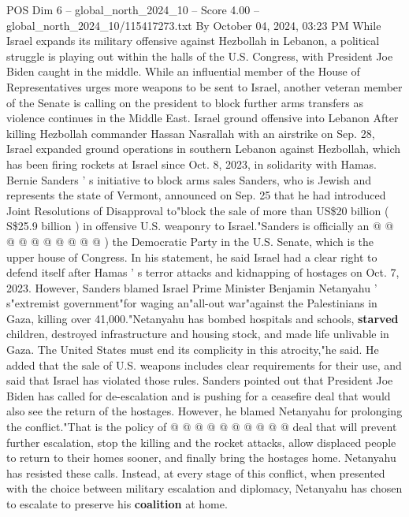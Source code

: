 \begin{textsample}{POS Dim 6 – global\_north\_2024\_10 – Score 4.00 – global\_north\_2024\_10/115417273.txt}  \label{ex:f6_pos_380}
By October 04, 2024, 03:23 PM While Israel expands its military offensive against Hezbollah in Lebanon, a political struggle is playing out within the halls of the U.S.
Congress, with President Joe Biden caught in the middle.
While an influential member of the House of Representatives urges more weapons to be sent to Israel, another veteran member of the Senate is calling on the president to block further arms transfers as violence continues in the Middle East.
Israel ground offensive into Lebanon After killing Hezbollah commander Hassan Nasrallah with an airstrike on Sep. 28, Israel expanded ground operations in southern Lebanon against Hezbollah, which has been firing rockets at Israel since Oct. 8, 2023, in solidarity with Hamas.
Bernie Sanders ' s initiative to block arms sales Sanders, who is Jewish and represents the state of Vermont, announced on Sep. 25 that he had introduced Joint Resolutions of Disapproval to"block the sale of more than US\$20 billion ( S\$25.9 billion ) in offensive U.S. weaponry to Israel."Sanders is officially an @ @ @ @ @ @ @ @ @ @ ) the Democratic Party in the U.S.
Senate, which is the upper house of Congress.
In his statement, he said Israel had a clear right to defend itself after Hamas ' s terror attacks and kidnapping of hostages on Oct. 7, 2023.
However, Sanders blamed Israel Prime Minister Benjamin Netanyahu ' s"extremist government"for waging an"all-out war"against the Palestinians in Gaza, killing over 41,000."Netanyahu has bombed hospitals and schools, \textbf{starved} children, destroyed infrastructure and housing stock, and made life unlivable in Gaza.
The United States must end its complicity in this atrocity,"he said.
He added that the sale of U.S. weapons includes clear requirements for their use, and said that Israel has violated those rules.
Sanders pointed out that President Joe Biden has called for de-escalation and is pushing for a ceasefire deal that would also see the return of the hostages.
However, he blamed Netanyahu for prolonging the conflict."That is the policy of @ @ @ @ @ @ @ @ @ @ deal that will prevent further escalation, stop the killing and the rocket attacks, allow displaced people to return to their homes sooner, and finally bring the hostages home.
Netanyahu has resisted these calls.
Instead, at every stage of this conflict, when presented with the choice between military escalation and diplomacy, Netanyahu has chosen to escalate to preserve his \textbf{coalition} at home.

\end{textsample}
